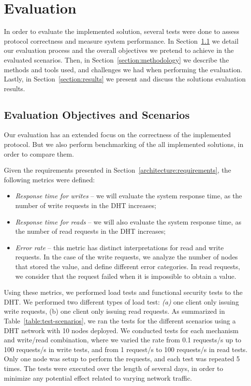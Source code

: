 \chapter{Evaluation}
\label{chapter:evaluation}

In order to evaluate the implemented solution, several tests were done to assess protocol correctness and measure system performance.
In Section~\ref{section:scenarios} we detail our evaluation process and the overall objectives we pretend to achieve in the evaluated scenarios.
Then, in Section~\ref{section:methodology} we describe the methods and tools used, and challenges we had when performing the evaluation.
Lastly, in Section~\ref{section:results} we present and discuss the solutions evaluation results.

\section{Evaluation Objectives and Scenarios}
\label{section:scenarios}

Our evaluation has an extended focus on the correctness of the implemented protocol.
But we also perform benchmarking of the all implemented solutions, in order to compare them.

Given the requirements presented in Section~\ref{architecture:requirements}, the following metrics were defined:

\begin{itemize}
  \item \textit{Response time for writes} – we will evaluate the system response time, as the number of write requests in the DHT increases;
  \item \textit{Response time for reads} – we will also evaluate the system response time, as the number of read requests in the DHT increases;
  \item \textit{Error rate} – this metric has distinct interpretations for read and write requests. In the case of the write requests, we analyze the number of nodes that stored the value, and define different error categories. In read requests, we consider that the request failed when it is impossible to obtain a value.
\end{itemize}

Using these metrics, we performed load tests and functional security tests to the \ac{DHT}.
We performed two different types of load test: \textit{(a)} one client only issuing write requests, (b) one client only issuing read requests.
As summarized in Table~\ref{table:test-scenarios}, we ran the tests for the different scenarios using a DHT network with 10 nodes deployed.
We conducted tests for each mechanism and write/read combination, where we varied the rate from 0.1 requests/s up to 100 requests/s in write tests, and from 1 request/s to 100 requests/s in read tests.
Only one node was setup to perform the requests, and each test was repeated 5 times.
The tests were executed over the length of several days, in order to minimize any potential effect related to varying network traffic.

